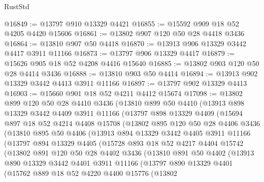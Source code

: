 \begin{lexlean}{RustStd}
\begin{coremodule}
@16849 := @13797 @910 @13329 @4421
@16855 := @15592 @909 @18 @52 @4205 @4420 @15606
@16861 := @13802 @907 @120 @50 @28 @4418 @3436
@16864 := @13810 @907 @50 @4418
@16870 := @13913 @906 @13329 @3442 @4417 @3911 @11166
@16873 := @13797 @906 @13329 @4417
@16879 := @15626 @905 @18 @52 @4208 @4416 @15640
@16885 := @13802 @903 @120 @50 @28 @4414 @3436
@16888 := @13810 @903 @50 @4414
@16894 := @13913 @902 @13329 @3442 @4413 @3911 @11166
@16897 := @13797 @902 @13329 @4413
@16903 := @15660 @901 @18 @52 @4211 @4412 @15674
@17098 := @13802
    @899
    @120
    @50
    @28
    @4410
    @3436
    (@13810
      @899
      @50
      @4410
      (@13913
        @898
        @13329
        @3442
        @4409
        @3911
        @11166
        (@13797
          @898
          @13329
          @4409
          (@15694
            @897
            @18
            @52
            @4214
            @4408
            @15708
            (@13802
              @895
              @120
              @50
              @28
              @4406
              @3436
              (@13810
                @895
                @50
                @4406
                (@13913
                  @894
                  @13329
                  @3442
                  @4405
                  @3911
                  @11166
                  (@13797
                    @894
                    @13329
                    @4405
                    (@15728
                      @893
                      @18
                      @52
                      @4217
                      @4404
                      @15742
                      (@13802
                        @891
                        @120
                        @50
                        @28
                        @4402
                        @3436
                        (@13810
                          @891
                          @50
                          @4402
                          (@13913
                            @890
                            @13329
                            @3442
                            @4401
                            @3911
                            @11166
                            (@13797
                              @890
                              @13329
                              @4401
                              (@15762
                                @889
                                @18
                                @52
                                @4220
                                @4400
                                @15776
                                (@13802

\end{coremodule}
\end{lexlean}
